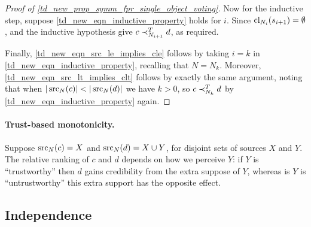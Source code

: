 \begin{proof}[Proof of \cref{td_new_prop_symm_fpr_single_object_voting}]
    Now for the inductive step, suppose \cref{td_new_eqn_inductive_property}
    holds for $i$. Since $\operatorname{cl}_{N_i}(s_{i + 1}) = \emptyset$,
    \freshposresp{} and the inductive hypothesis give $c \prec_{N_{i + 1}}^T d$,
    as required.

    Finally, \cref{td_new_eqn_src_le_implies_cle} follows by taking $i = k$ in
    \cref{td_new_eqn_inductive_property}, recalling that $N = N_k$. Moreover,
    \cref{td_new_eqn_src_lt_implies_clt} follows by exactly the same argument,
    noting that when $|\operatorname{src}_N(c)| < |\operatorname{src}_N(d)|$ we have $k > 0$, so $c
    \prec_{N_k}^T d$ by \cref{td_new_eqn_inductive_property} again.
\end{proof}

\paragraph{Trust-based monotonicity.}

Suppose $\operatorname{src}_N(c) = X$ and $\operatorname{src}_N(d) = X \cup Y$, for disjoint sets of
sources $X$ and $Y$. The relative ranking of $c$ and $d$ depends on how we
perceive $Y$: if $Y$ is ``trustworthy'' then $d$ gains credibility from the
extra suppose of $Y$, whereas is $Y$ is ``untrustworthy'' this extra support has
the opposite effect.



\subsection{Independence}
\label{td_new_sec_independence}

